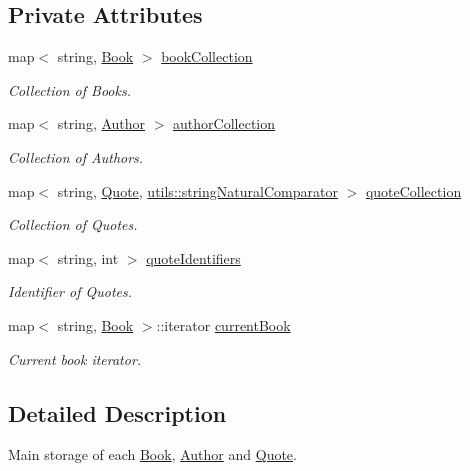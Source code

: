 \subsection*{Private Attributes}
\begin{DoxyCompactItemize}
\item 
map$<$ string, \hyperlink{class_book}{Book} $>$ \hyperlink{class_library_a5807d6d006ac0aa0a184831f0f2e5415}{book\+Collection}
\begin{DoxyCompactList}\small\item\em Collection of Books. \end{DoxyCompactList}\item 
map$<$ string, \hyperlink{class_author}{Author} $>$ \hyperlink{class_library_a7a6958a0dc85a1c816ca35727306cd62}{author\+Collection}
\begin{DoxyCompactList}\small\item\em Collection of Authors. \end{DoxyCompactList}\item 
map$<$ string, \hyperlink{class_quote}{Quote}, \hyperlink{structutils_1_1string_natural_comparator}{utils\+::string\+Natural\+Comparator} $>$ \hyperlink{class_library_a0f9136df5fc6e8901cb8524e026cb147}{quote\+Collection}
\begin{DoxyCompactList}\small\item\em Collection of Quotes. \end{DoxyCompactList}\item 
map$<$ string, int $>$ \hyperlink{class_library_a58c1f12a0278872cd0299e586551bb7a}{quote\+Identifiers}
\begin{DoxyCompactList}\small\item\em Identifier of Quotes. \end{DoxyCompactList}\item 
map$<$ string, \hyperlink{class_book}{Book} $>$\+::iterator \hyperlink{class_library_a78a4071e8d610da671b3886c71900dae}{current\+Book}
\begin{DoxyCompactList}\small\item\em Current book iterator. \end{DoxyCompactList}\end{DoxyCompactItemize}


\subsection{Detailed Description}
Main storage of each \hyperlink{class_book}{Book}, \hyperlink{class_author}{Author} and \hyperlink{class_quote}{Quote}. 

